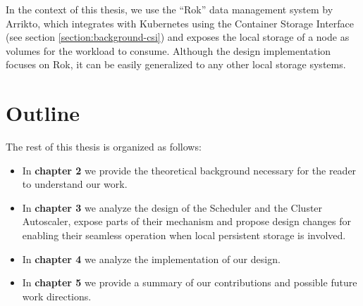 In the context of this thesis, we use the ``Rok'' data management system by
Arrikto, which integrates with Kubernetes using the Container Storage Interface
(see section \ref{section:background-csi}) and exposes the local storage of a
node as volumes for the workload to consume.  Although the design implementation
focuses on Rok, it can be easily generalized to any other local storage systems.

\section{Outline}
\label{section:intro_outline}

The rest of this thesis is organized as follows:

\begin{itemize}
      \item In \textbf{chapter 2} we provide the theoretical background
            necessary for the reader to understand our work.
      \item In \textbf{chapter 3} we analyze the design of the Scheduler and the
            Cluster Autoscaler, expose parts of their mechanism and propose
            design changes for enabling their seamless operation when local
            persistent storage is involved.
      \item In \textbf{chapter 4} we analyze the implementation of our design.
      \item In \textbf{chapter 5} we provide a summary of our contributions and
            possible future work directions.
\end{itemize}